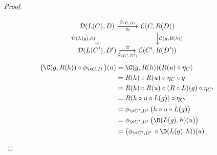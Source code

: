 \begin{theorem}
\begin{proof}
\begin{description}
        \[\begin{tikzcd}[ampersand replacement=\&]
          {\mathcal{D}(L(C), D)} \& {\mathcal{C}(C, R(D))} \\
          {\mathcal{D}(L(C'), D')} \& {\mathcal{C}(C', R(D'))}
          \arrow["{\phi_{\langle C,D\rangle }}", from=1-1, to=1-2]
          \arrow["{\mathcal{D}(L(g),h)}"', from=1-1, to=2-1]
          \arrow["{\phi_{\langle C',D'\rangle}}"', from=2-1, to=2-2]
          \arrow["{\mathcal{C}(g,R(h))}", from=1-2, to=2-2]
          \arrow["\cong", from=2-1, to=2-2]
          \arrow["\cong"', from=1-1, to=1-2]
        \end{tikzcd}\]
        \[
          \begin{aligned}
            \big(\C(g, R(h))\circ \phi_{\<C,D\>}\big)(u)
            &= \C(g, R(h))(R(u)\circ\eta_C)\\
            &= R(h)\circ R(u)\circ\eta_C \circ g\\
            &= R(h)\circ R(u) \circ (R\circ L)(g)\circ \eta_{C'}\\
            &= R(h\circ u\circ L(g))\circ \eta_{C'}\\
            &= \phi_{\<C', D'\>}\big(h\circ u \circ L(g)\big)\\
            &= \phi_{\<C', D'\>}\big(\D(L(g), h)(u)\big)\\
            &= \big(\phi_{\<C', D'\>}\circ \D(L(g), h))(u)
          \end{aligned}
        \]
    \end{description}
  \end{proof}
\end{theorem}